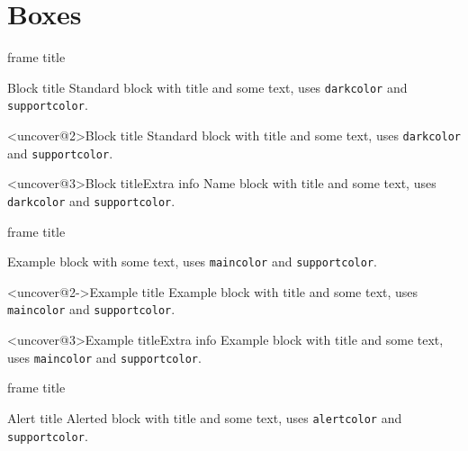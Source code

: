 \section{Boxes}

\begin{frame}{frame title}
    \begin{block}{Block title}
        Standard block with title and some text, uses \texttt{darkcolor} and \texttt{supportcolor}.
    \end{block}
    \begin{block}<uncover@2>{Block title}
        Standard block with title and some text, uses \texttt{darkcolor} and \texttt{supportcolor}.
    \end{block}
    \begin{nameblock}<uncover@3>{Block title}{Extra info}
        Name block with title and some text, uses \texttt{darkcolor} and \texttt{supportcolor}.
    \end{nameblock}
\end{frame}

\begin{frame}{frame title}
    \begin{example}
        Example block with some text, uses \texttt{maincolor} and \texttt{supportcolor}.
    \end{example}
    \begin{exampleblock}<uncover@2->{Example title}
        Example block with title and some text, uses \texttt{maincolor} and \texttt{supportcolor}.
    \end{exampleblock}
    \begin{nameexblock}<uncover@3>{Example title}{Extra info}
        Example block with title and some text, uses \texttt{maincolor} and \texttt{supportcolor}.
    \end{nameexblock}
\end{frame}

\begin{frame}{frame title}
    \begin{alertblock}{Alert title}
        Alerted block with title and some text, uses \texttt{alertcolor} and \texttt{supportcolor}.
    \end{alertblock}
\end{frame}

